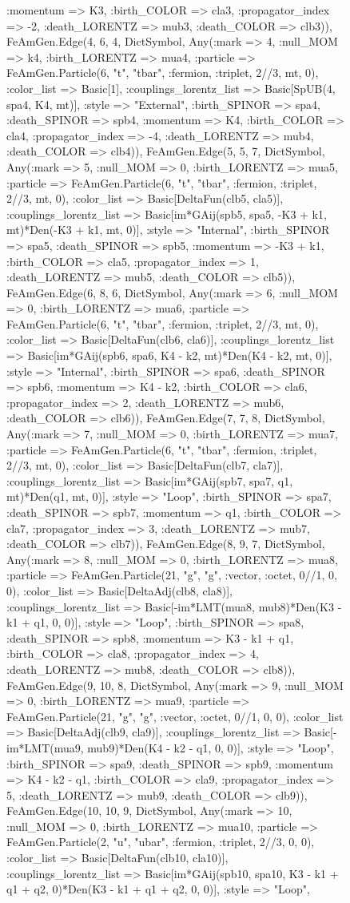 \documentclass{revtex4}
\begin{document}
\begin{figure}[!htb]
\begin{center}
{:momentum => K3, :birth_COLOR => cla3, :propagator_index => -2, :death_LORENTZ => mub3, :death_COLOR => clb3)), FeAmGen.Edge(4, 6, 4, Dict{Symbol, Any}(:mark => 4, :null_MOM => k4, :birth_LORENTZ => mua4, :particle => FeAmGen.Particle(6, "t", "tbar", :fermion, :triplet, 2//3, mt, 0), :color_list => Basic[1], :couplings_lorentz_list => Basic[SpUB(4, spa4, K4, mt)], :style => "External", :birth_SPINOR => spa4, :death_SPINOR => spb4, :momentum => K4, :birth_COLOR => cla4, :propagator_index => -4, :death_LORENTZ => mub4, :death_COLOR => clb4)), FeAmGen.Edge(5, 5, 7, Dict{Symbol, Any}(:mark => 5, :null_MOM => 0, :birth_LORENTZ => mua5, :particle => FeAmGen.Particle(6, "t", "tbar", :fermion, :triplet, 2//3, mt, 0), :color_list => Basic[DeltaFun(clb5, cla5)], :couplings_lorentz_list => Basic[im*GAij(spb5, spa5, -K3 + k1, mt)*Den(-K3 + k1, mt, 0)], :style => "Internal", :birth_SPINOR => spa5, :death_SPINOR => spb5, :momentum => -K3 + k1, :birth_COLOR => cla5, :propagator_index => 1, :death_LORENTZ => mub5, :death_COLOR => clb5)), FeAmGen.Edge(6, 8, 6, Dict{Symbol, Any}(:mark => 6, :null_MOM => 0, :birth_LORENTZ => mua6, :particle => FeAmGen.Particle(6, "t", "tbar", :fermion, :triplet, 2//3, mt, 0), :color_list => Basic[DeltaFun(clb6, cla6)], :couplings_lorentz_list => Basic[im*GAij(spb6, spa6, K4 - k2, mt)*Den(K4 - k2, mt, 0)], :style => "Internal", :birth_SPINOR => spa6, :death_SPINOR => spb6, :momentum => K4 - k2, :birth_COLOR => cla6, :propagator_index => 2, :death_LORENTZ => mub6, :death_COLOR => clb6)), FeAmGen.Edge(7, 7, 8, Dict{Symbol, Any}(:mark => 7, :null_MOM => 0, :birth_LORENTZ => mua7, :particle => FeAmGen.Particle(6, "t", "tbar", :fermion, :triplet, 2//3, mt, 0), :color_list => Basic[DeltaFun(clb7, cla7)], :couplings_lorentz_list => Basic[im*GAij(spb7, spa7, q1, mt)*Den(q1, mt, 0)], :style => "Loop", :birth_SPINOR => spa7, :death_SPINOR => spb7, :momentum => q1, :birth_COLOR => cla7, :propagator_index => 3, :death_LORENTZ => mub7, :death_COLOR => clb7)), FeAmGen.Edge(8, 9, 7, Dict{Symbol, Any}(:mark => 8, :null_MOM => 0, :birth_LORENTZ => mua8, :particle => FeAmGen.Particle(21, "g", "g", :vector, :octet, 0//1, 0, 0), :color_list => Basic[DeltaAdj(clb8, cla8)], :couplings_lorentz_list => Basic[-im*LMT(mua8, mub8)*Den(K3 - k1 + q1, 0, 0)], :style => "Loop", :birth_SPINOR => spa8, :death_SPINOR => spb8, :momentum => K3 - k1 + q1, :birth_COLOR => cla8, :propagator_index => 4, :death_LORENTZ => mub8, :death_COLOR => clb8)), FeAmGen.Edge(9, 10, 8, Dict{Symbol, Any}(:mark => 9, :null_MOM => 0, :birth_LORENTZ => mua9, :particle => FeAmGen.Particle(21, "g", "g", :vector, :octet, 0//1, 0, 0), :color_list => Basic[DeltaAdj(clb9, cla9)], :couplings_lorentz_list => Basic[-im*LMT(mua9, mub9)*Den(K4 - k2 - q1, 0, 0)], :style => "Loop", :birth_SPINOR => spa9, :death_SPINOR => spb9, :momentum => K4 - k2 - q1, :birth_COLOR => cla9, :propagator_index => 5, :death_LORENTZ => mub9, :death_COLOR => clb9)), FeAmGen.Edge(10, 10, 9, Dict{Symbol, Any}(:mark => 10, :null_MOM => 0, :birth_LORENTZ => mua10, :particle => FeAmGen.Particle(2, "u", "ubar", :fermion, :triplet, 2//3, 0, 0), :color_list => Basic[DeltaFun(clb10, cla10)], :couplings_lorentz_list => Basic[im*GAij(spb10, spa10, K3 - k1 + q1 + q2, 0)*Den(K3 - k1 + q1 + q2, 0, 0)], :style => "Loop", }
\end{center}
\end{figure}
\end{document}
